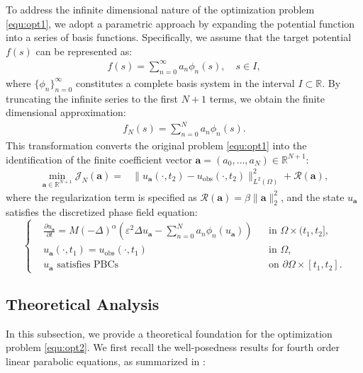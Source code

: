 \documentclass[11pt,reqno]{amsart}
\begin{document}
To address the infinite dimensional nature of the optimization problem \eqref{equ:opt1}, we adopt a parametric approach by expanding the potential function into a series of basis functions. Specifically, we assume that the target potential $f(s)$ can be represented as:
\begin{align*}
	f(s) = \sum_{n=0}^{\infty} a_n \phi_n(s), \quad s\in I,
\end{align*}
where $\{\phi_n\}_{n=0}^\infty$ constitutes a complete basis system in the interval $I\subset\mathbb{R}$. By truncating the infinite series to the first $N+1$ terms, we obtain the finite dimensional approximation:
\begin{align*}
	f_N(s) = \sum_{n=0}^{N} a_n \phi_n(s).
\end{align*}
This transformation converts the original problem \eqref{equ:opt1} into the identification of the finite coefficient vector $\mathbf{a} = (a_0, \dots, a_N) \in \mathbb{R}^{N+1}$:
\begin{equation}
	\label{equ:opt2}
	\begin{aligned}
		\min\limits_{\mathbf{a} \in \mathbb{R}^{N+1}} \mathcal{J}_N(\mathbf{a}) = & \|u_{\mathbf{a}}(\cdot,t_2) - u_{\text{obs}}(\cdot,t_2)\|_{L^2(\Omega)}^2 +  \mathcal{R}(\mathbf{a}), 
	\end{aligned}
\end{equation}
where the regularization term is specified as $\mathcal{R}(\mathbf{a}) = \beta\|\mathbf{a}\|_2^2$, and the state $u_{\mathbf{a}}$ satisfies the discretized phase field equation:
\begin{equation}
	\label{equ:ua}
	\left\{
	\begin{aligned}
		&\frac{\partial u_{\mathbf{a}}}{\partial t} = M(-\Delta)^{\alpha}\left(\varepsilon^2\Delta u_{\mathbf{a}} - \sum_{n=0}^N a_n \phi_n(u_{\mathbf{a}})\right) && \text{in } \Omega \times (t_1, t_2], \\
		&u_{\mathbf{a}}(\cdot,t_1) = u_{\text{obs}}(\cdot,t_1) && \text{in } \Omega, \\
		&u_{\mathbf{a}} \text{ satisfies PBCs} && \text{on } \partial\Omega \times [t_1, t_2].
	\end{aligned}
	\right.
\end{equation}

\subsection{Theoretical Analysis} 
In this subsection, we provide a theoretical foundation for the optimization problem \eqref{equ:opt2}. We first recall the well-posedness results for fourth order linear parabolic equations, as summarized in \cite{ni2024uniqueness}:
\end{document}
